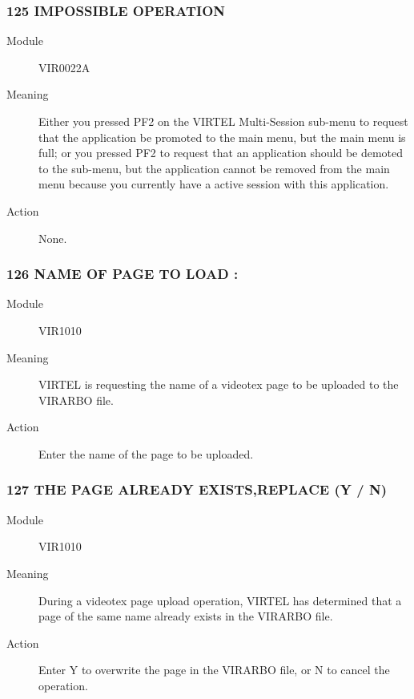 \documentclass[letterpaper,10pt,english]{sphinxmanual}
\begin{document}
\subsubsection{125 IMPOSSIBLE OPERATION}
\label{\detokenize{messages:impossible-operation}}\begin{description}
\item[{Module}] \leavevmode
VIR0022A

\item[{Meaning}] \leavevmode
Either you pressed PF2 on the VIRTEL Multi-Session sub-menu to request that the application be promoted to the main menu, but the main menu is full; or you pressed PF2 to request that an application should be demoted to the sub-menu, but the application cannot be removed from the main menu because you currently have a active session with this application.

\item[{Action}] \leavevmode
None.

\end{description}


\subsubsection{126 NAME OF PAGE TO LOAD :}
\label{\detokenize{messages:name-of-page-to-load}}\begin{description}
\item[{Module}] \leavevmode
VIR1010

\item[{Meaning}] \leavevmode
VIRTEL is requesting the name of a videotex page to be uploaded to the VIRARBO file.

\item[{Action}] \leavevmode
Enter the name of the page to be uploaded.

\end{description}


\subsubsection{127 THE PAGE ALREADY EXISTS,REPLACE (Y / N)}
\label{\detokenize{messages:the-page-already-exists-replace-y-n}}\begin{description}
\item[{Module}] \leavevmode
VIR1010

\item[{Meaning}] \leavevmode
During a videotex page upload operation, VIRTEL has determined that a page of the same name already exists in the VIRARBO file.

\item[{Action}] \leavevmode
Enter Y to overwrite the page in the VIRARBO file, or N to cancel the operation.

\end{description}
\end{document}
